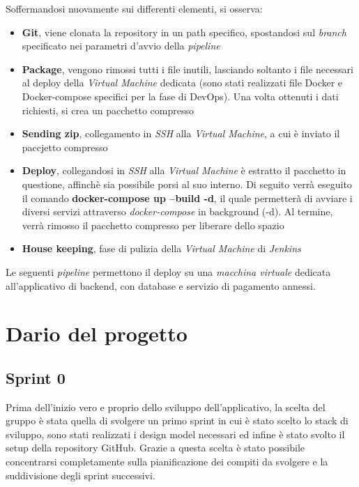 \documentclass{article}
\begin{document}
Soffermandosi nuovamente sui differenti elementi, si osserva:
\begin{itemize}[label = {-}]
    \itemsep0em
    \item \textbf{Git}, viene clonata la repository in un path specifico, spostandosi sul \textit{branch} specificato nei parametri d'avvio della \textit{pipeline}
    \item \textbf{Package}, vengono rimossi tutti i file inutili, lasciando soltanto i file necessari al deploy della \textit{Virtual Machine} dedicata (sono stati realizzati file Docker e Docker-compose specifici per la fase di DevOps). Una volta ottenuti i dati richiesti, si crea un pacchetto compresso
    \item \textbf{Sending zip}, collegamento in \textit{SSH} alla \textit{Virtual Machine}, a cui è inviato il paccjetto compresso
    \item \textbf{Deploy}, collegandosi in \textit{SSH} alla \textit{Virtual Machine} è estratto il pacchetto in questione, affinchè sia possibile porsi al suo interno. Di seguito verrà eseguito il comando \textbf{docker-compose up --build -d}, il quale permetterà di avviare i diversi servizi attraverso \textit{docker-compose} in background (-d). Al termine, verrà rimosso il pacchetto compresso per liberare dello spazio
    \item \textbf{House keeping}, fase di pulizia della \textit{Virtual Machine} di \textit{Jenkins}
\end{itemize}
Le seguenti \textit{pipeline} permettono il deploy su una \textit{macchina virtuale} dedicata all'applicativo di backend, con database e servizio di pagamento annessi.

\section{Dario del progetto}

\subsection{Sprint 0}
Prima dell'inizio vero e proprio dello sviluppo dell'applicativo, la scelta del gruppo è stata quella di svolgere un primo sprint in cui è stato scelto lo stack di sviluppo, sono stati realizzati i design model necessari ed infine è stato svolto il setup della repository GitHub. Grazie a questa scelta è stato possibile concentrarsi completamente sulla pianificazione dei compiti da svolgere e la suddivisione degli sprint successivi.
\end{document}
